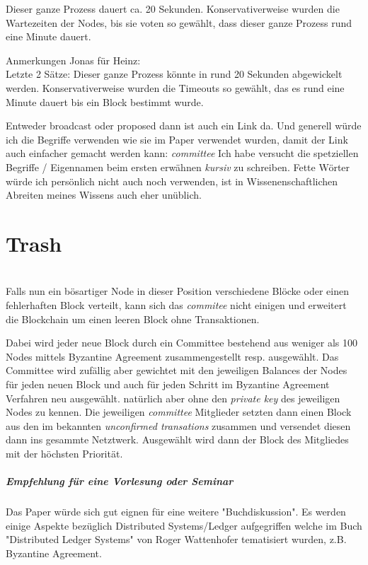 \documentclass[11pt,a4paper]{article}
\begin{document}
Dieser ganze Prozess dauert ca. 20 Sekunden. Konservativerweise wurden die Wartezeiten der Nodes, bis sie voten so gew\"ahlt, dass dieser ganze Prozess rund eine Minute dauert.

Anmerkungen Jonas f\"ur Heinz:\\
	Letzte 2 S\"atze:
	Dieser ganze Prozess k\"onnte in rund 20 Sekunden abgewickelt werden.
	Konservativerweise wurden die Timeouts so gew\"ahlt, das es rund eine Minute dauert bis ein Block bestimmt wurde.

	Entweder broadcast oder proposed dann ist auch ein Link da.
	Und generell w\"urde ich die Begriffe verwenden wie sie im Paper verwendet wurden, damit der Link auch einfacher gemacht werden kann:
		\textit{committee}
	Ich habe versucht die spetziellen Begriffe / Eigennamen beim ersten erwähnen \textit{kursiv} zu schreiben.
	Fette Wörter würde ich persönlich nicht auch noch verwenden, ist in Wissenenschaftlichen Abreiten meines Wissens auch eher unüblich.

\newpage

\chapter{\textbf{\Large Trash}}\\
Falls nun ein b\"osartiger Node in dieser Position verschiedene Bl\"ocke oder einen fehlerhaften Block
verteilt, kann sich das \textit{commitee} nicht einigen und erweitert die Blockchain um einen leeren Block ohne Transaktionen.

Dabei wird jeder neue Block durch ein Committee bestehend aus weniger als 100 Nodes mittels Byzantine Agreement zusammengestellt resp. ausgew\"ahlt.
Das Committee wird zuf\"allig aber gewichtet mit den jeweiligen Balances der Nodes f\"ur jeden neuen Block und auch f\"ur jeden Schritt im Byzantine Agreement Verfahren neu ausgew\"ahlt.
nat\"urlich aber ohne den \textit{private key} des jeweiligen Nodes zu kennen.
Die jeweiligen \textit{committee} Mitglieder setzten dann einen Block aus den im bekannten \textit{unconfirmed transations} zusammen und versendet diesen dann ins gesammte Netztwerk.
Ausgew\"ahlt wird dann der Block des Mitgliedes mit der h\"ochsten Priorit\"at.



\paragraph*{Empfehlung f\"ur eine Vorlesung oder Seminar}
Das Paper \cite{Gilad:2017:ASB:3132747.3132757} w\"urde sich gut eignen f\"ur eine weitere "Buchdiskussion".
Es werden einige Aspekte bez\"uglich Distributed Systems/Ledger aufgegriffen welche
im Buch "Distributed Ledger Systems" von Roger Wattenhofer tematisiert wurden, z.B. Byzantine Agreement.
\end{document}
